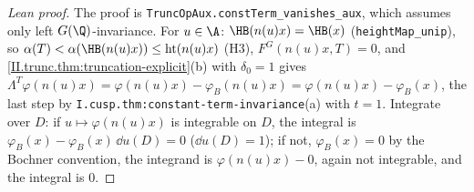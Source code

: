 \begin{proof}[Lean proof]
The proof is \texttt{TruncOpAux.constTerm\_vanishes\_aux}, which assumes only left $G(\Q)$-invariance. For $u\in\A$: $\HB(n(u)x)=\HB(x)$ (\texttt{heightMap\_unip}), so $\alpha(T)<\alpha(\HB(n(u)x))\le\operatorname{ht}(n(u)x)$ (H3), $F^G(n(u)x,T)=0$, and \cref{II.trunc.thm:truncation-explicit}(b) with $\delta_0=1$ gives $\Lambda^T\varphi(n(u)x)=\varphi(n(u)x)-\varphi_B(n(u)x)=\varphi(n(u)x)-\varphi_B(x)$, the last step by \texttt{I.cusp.thm:constant-term-invariance}(a) with $t=1$. Integrate over $D$: if $u\mapsto\varphi(n(u)x)$ is integrable on $D$, the integral is $\varphi_B(x)-\varphi_B(x)\,\dd u(D)=0$ ($\dd u(D)=1$); if not, $\varphi_B(x)=0$ by the Bochner convention, the integrand is $\varphi(n(u)x)-0$, again not integrable, and the integral is $0$.
\end{proof}

